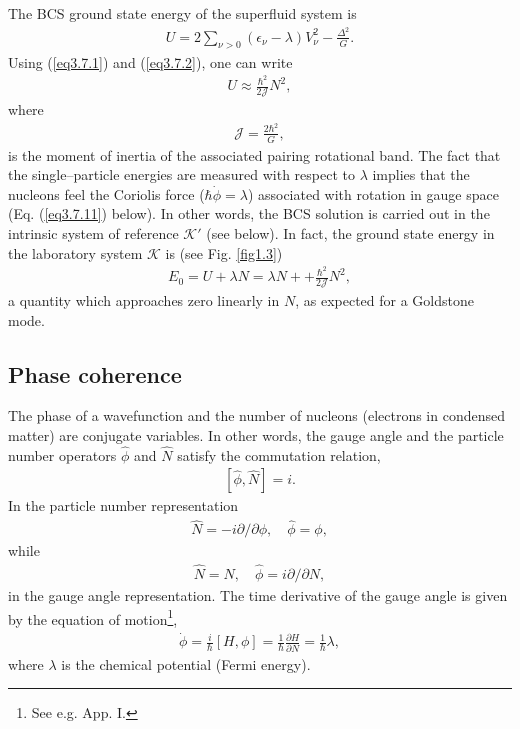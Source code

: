 The BCS ground state energy of the superfluid system is
  \begin{align}\label{eq3.7.3}
U=2\sum_{\nu>0}(\epsilon_\nu-\lambda)V^2_\nu-\frac{\Delta^2}{G}.
  \end{align}
Using (\ref{eq3.7.1}) and (\ref{eq3.7.2}), one can write
  \begin{align}\label{eq3.7.4}
U\approx\frac{\hbar^2}{2\mathcal J}N^2,  
    \end{align}
where
  \begin{align}\label{eq3.7.5}
\mathcal J=\frac{2\hbar^2}{G},  
    \end{align}
is the moment of inertia of the associated pairing rotational band. The fact that the single--particle energies are measured with respect to $\lambda$ implies that the nucleons feel the Coriolis force ($\hbar\dot{\phi}=\lambda$) associated with rotation in gauge space (Eq. (\ref{eq3.7.11}) below). In other words, the BCS solution is carried out in the intrinsic system of reference $\mathcal K'$ (see below). In fact, the ground state energy in the laboratory system $\mathcal K$ is (see Fig. \ref{fig1.3})
  \begin{align}\label{eq3.7.6}
E_0=U+\lambda N=\lambda N++\frac{\hbar^2}{2\mathcal J}N^2,  
    \end{align}
a quantity which approaches zero linearly in $N$, as expected for a Goldstone mode.















\subsection{Phase coherence}\label{C3AppD}
The phase of a wavefunction and the number of nucleons (electrons in condensed matter) are conjugate variables. In other words, the gauge angle and the particle number operators $\hat{\phi}$ and $\hat N$ satisfy the commutation relation,
  \begin{align}\label{eq3.7.8}
\left[\hat{\phi},\hat{N}\right]=i.
    \end{align}
In the particle number representation
  \begin{align}\label{eq3.7.9}
\hat N=-i\partial/\partial \phi,\quad \hat \phi=\phi,
    \end{align}
while
  \begin{align}\label{eq3.7.10}
\hat N=N,\quad \hat\phi=i\partial/\partial N,
    \end{align}
in the gauge angle representation. The time derivative of the gauge angle is given by the equation of motion\footnote{See e.g. \cite{Brink:05} App. I.},
  \begin{align}\label{eq3.7.11}
  \dot{\phi}=\frac{i}{\hbar}\left[H,\phi \right]=\frac{1}{\hbar}\frac{\partial H}{\partial N}=\frac{1}{\hbar}\lambda,
    \end{align}
where $\lambda$ is the chemical potential (Fermi energy).







